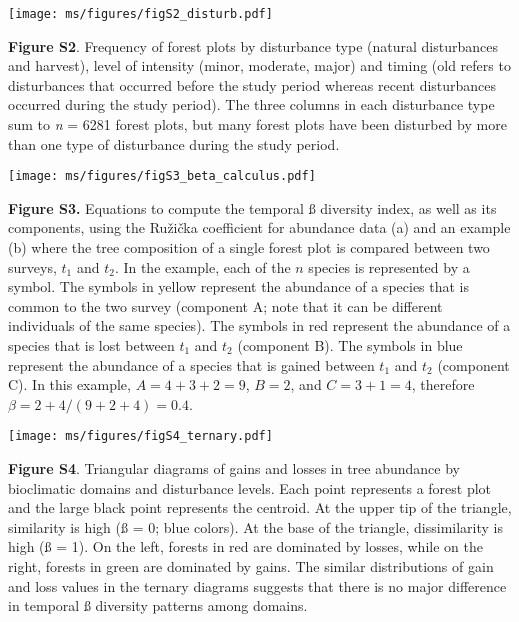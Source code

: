 \documentclass[
]{article}
\begin{document}
\pagebreak

\texttt{[image: ms/figures/figS2\_disturb.pdf]}

\textbf{Figure S2}. Frequency of forest plots by disturbance type
(natural disturbances and harvest), level of intensity (minor, moderate,
major) and timing (old refers to disturbances that occurred before the
study period whereas recent disturbances occurred during the study
period). The three columns in each disturbance type sum to \emph{n} =
6281 forest plots, but many forest plots have been disturbed by more
than one type of disturbance during the study period.

\pagebreak

\texttt{[image: ms/figures/figS3\_beta\_calculus.pdf]}

\textbf{Figure S3.} Equations to compute the temporal ß diversity index,
as well as its components, using the Ružička coefficient for abundance
data (a) and an example (b) where the tree composition of a single
forest plot is compared between two surveys, \(t_1\) and \(t_2\). In the
example, each of the \(n\) species is represented by a symbol. The
symbols in yellow represent the abundance of a species that is common to
the two survey (component A; note that it can be different individuals
of the same species). The symbols in red represent the abundance of a
species that is lost between \(t_1\) and \(t_2\) (component B). The
symbols in blue represent the abundance of a species that is gained
between \(t_1\) and \(t_2\) (component C). In this example,
\(A = 4 + 3 + 2 = 9\), \(B = 2\), and \(C = 3 + 1 = 4\), therefore
\(\beta = 2+4/(9+2+4) = 0.4\).

\pagebreak

\texttt{[image: ms/figures/figS4\_ternary.pdf]}

\textbf{Figure S4}. Triangular diagrams of gains and losses in tree
abundance by bioclimatic domains and disturbance levels. Each point
represents a forest plot and the large black point represents the
centroid. At the upper tip of the triangle, similarity is high (ß = 0;
blue colors). At the base of the triangle, dissimilarity is high (ß =
1). On the left, forests in red are dominated by losses, while on the
right, forests in green are dominated by gains. The similar
distributions of gain and loss values in the ternary diagrams suggests
that there is no major difference in temporal ß diversity patterns among
domains.
\end{document}

